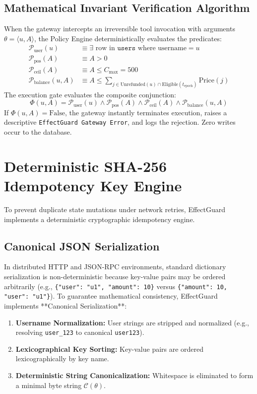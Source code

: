 \subsection{Mathematical Invariant Verification Algorithm}
When the gateway intercepts an irreversible tool invocation with arguments $\theta = \langle u, A \rangle$, the Policy Engine deterministically evaluates the predicates:
\begin{align}
    \mathcal{P}_{\text{user}}(u) &\equiv \exists \text{ row in } \texttt{users} \text{ where } \text{username} = u \\
    \mathcal{P}_{\text{pos}}(A) &\equiv A > 0 \\
    \mathcal{P}_{\text{ceil}}(A) &\equiv A \le C_{\text{max}} = 500 \\
    \mathcal{P}_{\text{balance}}(u, A) &\equiv A \le \sum_{j \in \text{Unrefunded}(u) \cap \text{Eligible}(t_{\text{epoch}})} \text{Price}(j)
\end{align}
The execution gate evaluates the composite conjunction:
\begin{equation}
    \Phi(u, A) = \mathcal{P}_{\text{user}}(u) \land \mathcal{P}_{\text{pos}}(A) \land \mathcal{P}_{\text{ceil}}(A) \land \mathcal{P}_{\text{balance}}(u, A)
\end{equation}
If $\Phi(u, A) = \text{False}$, the gateway instantly terminates execution, raises a descriptive \texttt{EffectGuard Gateway Error}, and logs the rejection. Zero writes occur to the database.

\section{Deterministic SHA-256 Idempotency Key Engine}
\label{sec:design_idempotency}
To prevent duplicate state mutations under network retries, EffectGuard implements a deterministic cryptographic idempotency engine.

\subsection{Canonical JSON Serialization}
In distributed HTTP and JSON-RPC environments, standard dictionary serialization is non-deterministic because key-value pairs may be ordered arbitrarily (e.g., \texttt{\{"user": "u1", "amount": 10\}} versus \texttt{\{"amount": 10, "user": "u1"\}}). To guarantee mathematical consistency, EffectGuard implements **Canonical Serialization**:
\begin{enumerate}
    \item \textbf{Username Normalization:} User strings are stripped and normalized (e.g., resolving \texttt{user\_123} to canonical \texttt{user123}).
    \item \textbf{Lexicographical Key Sorting:} Key-value pairs are ordered lexicographically by key name.
    \item \textbf{Deterministic String Canonicalization:} Whitespace is eliminated to form a minimal byte string $\mathcal{C}(\theta)$.
\end{enumerate}

